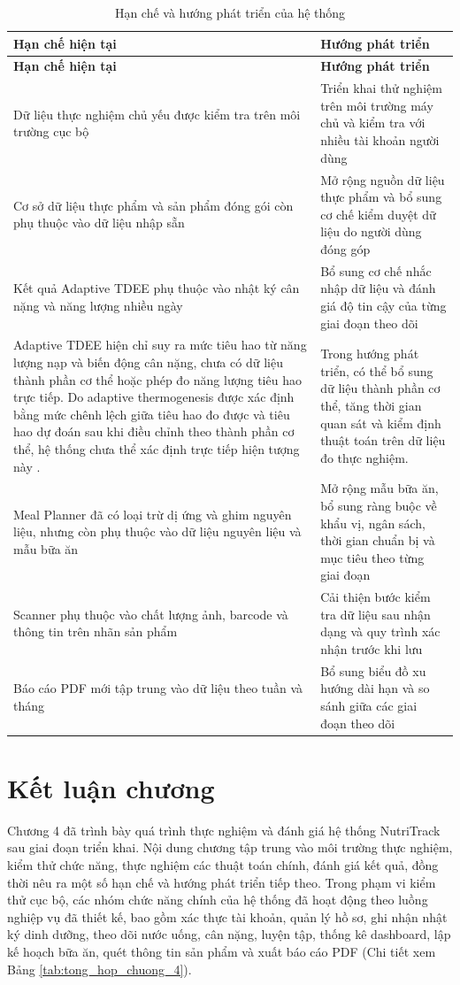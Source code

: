 \documentclass[12pt, a4paper]{report}
\begin{document}
\begin{longtable}{|>{\raggedright\arraybackslash}p{5cm}|p{10cm}|}
\caption{Hạn chế và hướng phát triển của hệ thống}
\label{tab:han_che_huong_phat_trien} \\
\hline
\textbf{Hạn chế hiện tại} & \textbf{Hướng phát triển} \\
\hline
\endfirsthead
\hline
\textbf{Hạn chế hiện tại} & \textbf{Hướng phát triển} \\
\hline
\endhead

Dữ liệu thực nghiệm chủ yếu được kiểm tra trên môi trường cục bộ & Triển khai thử nghiệm trên môi trường máy chủ và kiểm tra với nhiều tài khoản người dùng \\
\hline
Cơ sở dữ liệu thực phẩm và sản phẩm đóng gói còn phụ thuộc vào dữ liệu nhập sẵn & Mở rộng nguồn dữ liệu thực phẩm và bổ sung cơ chế kiểm duyệt dữ liệu do người dùng đóng góp \\
\hline
Kết quả Adaptive TDEE phụ thuộc vào nhật ký cân nặng và năng lượng nhiều ngày & Bổ sung cơ chế nhắc nhập dữ liệu và đánh giá độ tin cậy của từng giai đoạn theo dõi \\
\hline
Adaptive TDEE hiện chỉ suy ra mức tiêu hao từ năng lượng nạp và biến động cân nặng, chưa có dữ liệu thành phần cơ thể hoặc phép đo năng lượng tiêu hao trực tiếp. Do adaptive thermogenesis được xác định bằng mức chênh lệch giữa tiêu hao đo được và tiêu hao dự đoán sau khi điều chỉnh theo thành phần cơ thể, hệ thống chưa thể xác định trực tiếp hiện tượng này \cite{nunes2022, muller2013}. & Trong hướng phát triển, có thể bổ sung dữ liệu thành phần cơ thể, tăng thời gian quan sát và kiểm định thuật toán trên dữ liệu đo thực nghiệm. \\
\hline
Meal Planner đã có loại trừ dị ứng và ghim nguyên liệu, nhưng còn phụ thuộc vào dữ liệu nguyên liệu và mẫu bữa ăn & Mở rộng mẫu bữa ăn, bổ sung ràng buộc về khẩu vị, ngân sách, thời gian chuẩn bị và mục tiêu theo từng giai đoạn \\
\hline
Scanner phụ thuộc vào chất lượng ảnh, barcode và thông tin trên nhãn sản phẩm & Cải thiện bước kiểm tra dữ liệu sau nhận dạng và quy trình xác nhận trước khi lưu \\
\hline
Báo cáo PDF mới tập trung vào dữ liệu theo tuần và tháng & Bổ sung biểu đồ xu hướng dài hạn và so sánh giữa các giai đoạn theo dõi \\
\hline
\end{longtable}


\section{Kết luận chương}Chương 4 đã trình bày quá trình thực nghiệm và đánh giá hệ thống NutriTrack sau giai đoạn triển khai. Nội dung chương tập trung vào môi trường thực nghiệm, kiểm thử chức năng, thực nghiệm các thuật toán chính, đánh giá kết quả, đồng thời nêu ra một số hạn chế và hướng phát triển tiếp theo. Trong phạm vi kiểm thử cục bộ, các nhóm chức năng chính của hệ thống đã hoạt động theo luồng nghiệp vụ đã thiết kế, bao gồm xác thực tài khoản, quản lý hồ sơ, ghi nhận nhật ký dinh dưỡng, theo dõi nước uống, cân nặng, luyện tập, thống kê dashboard, lập kế hoạch bữa ăn, quét thông tin sản phẩm và xuất báo cáo PDF (Chi tiết xem Bảng \ref{tab:tong_hop_chuong_4}).
\end{document}
